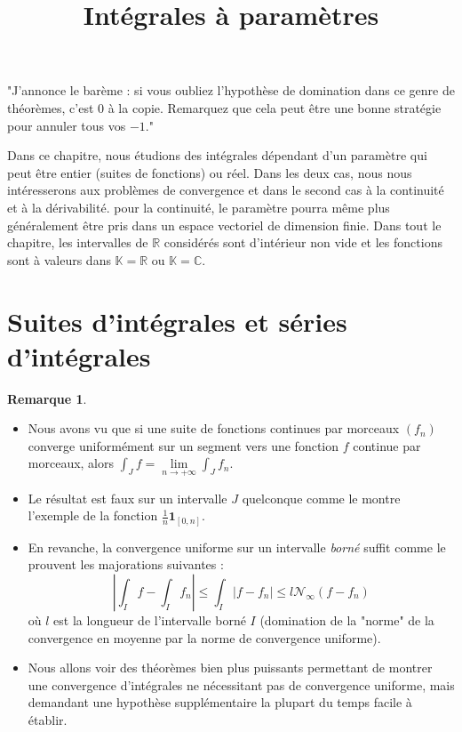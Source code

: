 \documentclass[french]{article}
\title{Intégrales à paramètres}
\date{}
\newcommand{\R}{\mathbb{R}}
\newcommand{\C}{\mathbb{C}}
\newcommand{\K}{\mathbb{K}}
\theoremstyle{plain}
\theoremstyle{definition}
\newtheorem*{rmq}{Remarque}
\theoremstyle{remark}
\begin{document}
\tableofcontents
\newpage
\maketitle

"J'annonce le barème : si vous oubliez l'hypothèse de domination dans ce genre de théorèmes, c'est $0$ à la copie. Remarquez que cela peut être une bonne stratégie pour annuler tous vos $-1$."

Dans ce chapitre, nous étudions des intégrales dépendant d'un paramètre qui peut être entier (suites de fonctions) ou réel. Dans les deux cas, nous nous intéresserons aux problèmes de convergence et dans le second cas à la continuité et à la dérivabilité. pour la continuité, le paramètre pourra même plus généralement être pris dans un espace vectoriel de dimension finie. Dans tout le chapitre, les intervalles de $\R$ considérés sont d'intérieur non vide et les fonctions sont à valeurs dans $\K=\R$ ou $\K=\C$.

\section{Suites d'intégrales et séries d'intégrales}

\begin{rmq}
	\begin{itemize}
		\item Nous avons vu que si une suite de fonctions continues par morceaux $(f_n)$ converge uniformément sur un segment vers une fonction $f$ continue par morceaux, alors $\displaystyle\int_J f=\underset{n\to+\infty}{\lim}\int_J f_n$.
		\item Le résultat est faux sur un intervalle $J$ quelconque comme le montre l'exemple de la fonction $\displaystyle\frac{1}{n}\textbf{1}_{[0,n]}$.
		\item En revanche, la convergence uniforme sur un intervalle \textit{borné} suffit comme le prouvent les majorations suivantes :
		$$\left\lvert\int_I f-\int_I f_n\right\rvert\leqslant\int_I\lvert f-f_n\rvert\leqslant l\mathcal{N}_\infty(f-f_n)$$ où $l$ est la longueur de l'intervalle borné $I$ (domination de la "norme" de la convergence en moyenne par la norme de convergence uniforme).
		\item Nous allons voir des théorèmes bien plus puissants permettant de montrer une convergence d'intégrales ne nécessitant pas de convergence uniforme, mais demandant une hypothèse supplémentaire la plupart du temps facile à établir.
	\end{itemize}
\end{rmq}
\end{document}
